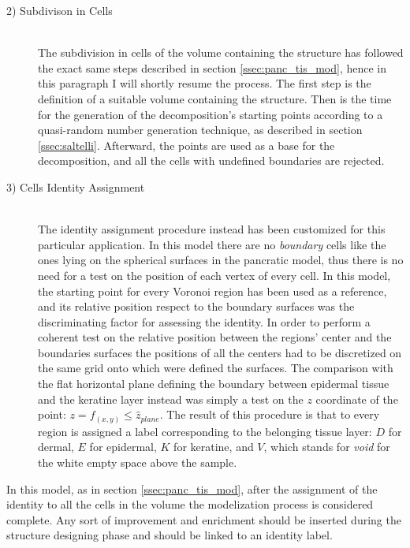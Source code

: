 \begin{description}
        \item [2) Subdivison in Cells] \hfill \\
        The subdivision in cells of the volume containing the structure has followed the exact same steps described in section \ref{ssec:panc_tis_mod}, hence in this paragraph I will shortly resume the process. The first step is the definition of a suitable volume containing the structure. Then is the time for the generation of the decomposition's starting points according to a quasi-random number generation technique, as described in section \ref{ssec:saltelli}. Afterward, the points are used as a base for the decomposition, and all the cells with undefined boundaries are rejected.

        \item [3) Cells Identity Assignment] \hfill \\
        The identity assignment procedure instead has been customized for this particular application. In this model there are no \textit{boundary} cells like the ones lying on the spherical surfaces in the pancratic model, thus there is no need for a test on the position of each vertex of every cell. In this model, the starting point for every Voronoi region has been used as a reference, and its relative position respect to the boundary surfaces was the discriminating factor for assessing the identity. In order to perform a coherent test on the relative position between the regions' center and the boundaries surfaces the positions of all the centers had to be discretized on the same grid onto which were defined the surfaces. The comparison with the flat horizontal plane defining the boundary between epidermal tissue and the keratine layer instead was simply a test on the $z$ coordinate of the point: $z = f_{(x,y)} \leq \hat{z}_{plane}$. The result of this procedure is that to every region is assigned a label corresponding to the belonging tissue layer: $D$ for dermal, $E$ for epidermal, $K$ for keratine, and $V$, which stands for \textit{void} for the white empty space above the sample.

    \end{description}

    In this model, as in section \ref{ssec:panc_tis_mod}, after the assignment of the identity to all the cells in the volume the modelization process is considered complete. Any sort of improvement and enrichment should be inserted during the structure designing phase and should be linked to an identity label.
